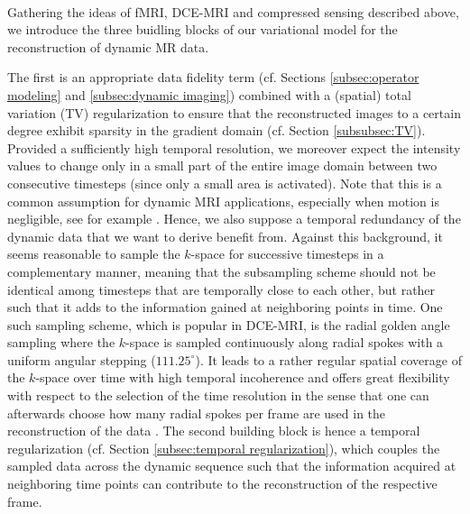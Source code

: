 \\
\noindent
Gathering the ideas of fMRI, DCE-MRI and compressed sensing described above, we introduce the three buidling blocks of our variational model for the reconstruction of dynamic MR data. 

The first is an appropriate data fidelity term (cf. Sections \ref{subsec:operator modeling} and \ref{subsec:dynamic imaging}) combined with a (spatial) total variation (TV) regularization \cite{Rudin:ROF} to ensure that the reconstructed images to a certain degree exhibit sparsity in the gradient domain (cf. Section \ref{subsubsec:TV}). 
Provided a sufficiently high temporal resolution, we moreover expect the intensity values to change only in a small part of the entire image domain between two consecutive timesteps (since only a small area is activated). 
Note that this is a common assumption for dynamic MRI applications, especially when motion is negligible, see for example \cite{feng2013,feng2014,wundrak2016}.
Hence, we also suppose a temporal redundancy of the dynamic data that we want to derive benefit from. 
Against this background, it seems reasonable to sample the $k$-space for successive timesteps in a complementary manner, meaning that the subsampling scheme should not be identical among timesteps that are temporally close to each other, but rather such that it adds to the information gained at neighboring points in time. 
One such sampling scheme, which is popular in DCE-MRI, is the radial golden angle sampling where the $k$-space is sampled continuously along radial spokes with a uniform angular stepping ($111.25^\circ$).
It leads to a rather regular spatial coverage of the $k$-space over time with high temporal incoherence and offers great flexibility with respect to the selection of the time resolution in the sense that one can afterwards choose how many radial spokes per frame are used in the reconstruction of the data \cite{winkelmann2007,feng2014}.
The second building block is hence a temporal regularization (cf. Section \ref{subsec:temporal regularization}), which couples the sampled data across the dynamic sequence such that the information acquired at neighboring time points can contribute to the reconstruction of the respective frame.

